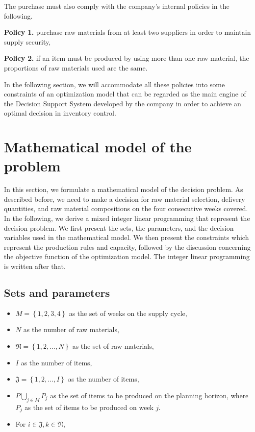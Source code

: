 \documentclass[preprint, 3p,
authoryear]{elsarticle} %
\providecommand{\tightlist}{%
  \setlength{\itemsep}{0pt}\setlength{\parskip}{0pt}}
\begin{document}
The purchase must also comply with the company's internal policies in
the following.

\textbf{Policy 1.} purchase raw materials from at least two suppliers in
order to maintain supply security,

\textbf{Policy 2.} if an item must be produced by using more than one
raw material, the proportions of raw materials used are the same.

In the following section, we will accommodate all these policies into
some constraints of an optimization model that can be regarded as the
main engine of the Decision Support System developed by the company in
order to achieve an optimal decision in inventory control.

\hypertarget{mathematical-model-of-the-problem}{%
\section{Mathematical model of the
problem}\label{mathematical-model-of-the-problem}}

In this section, we formulate a mathematical model of the decision
problem. As described before, we need to make a decision for raw
material selection, delivery quantities, and raw material compositions
on the four consecutive weeks covered. In the following, we derive a
mixed integer linear programming that represent the decision problem. We
first present the sets, the parameters, and the decision variables used
in the mathematical model. We then present the constraints which
represent the production rules and capacity, followed by the discussion
concerning the objective function of the optimization model. The integer
linear programming is written after that.

\hypertarget{sets-and-parameters}{%
\subsection{Sets and parameters}\label{sets-and-parameters}}

\begin{itemize}
\tightlist
\item
  \(M = \left\{ 1,2,3,4 \right\}\) as the set of weeks on the supply
  cycle,
\item
  \(N\) as the number of raw materials,
\item
  \(\mathfrak{N}= \left\{ 1,2,...,N \right\}\) as the set of
  raw-materials,
\item
  \(I\) as the number of items,
\item
  \(\mathfrak{J} = \left\{ 1, 2, ..., I \right\}\) as the number of
  items,
\item
  \(P \bigcup_{j \in M} P_j\) as the set of items to be produced on the
  planning horizon, where \(P_j\) as the set of items to be produced on
  week \(j\).
\item
  For \(i \in \mathfrak{J}, k \in \mathfrak{N}\),
\end{itemize}
\end{document}
